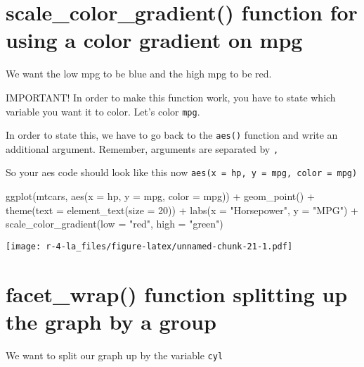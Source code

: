 \documentclass[
]{book}
\newenvironment{Shaded}{\begin{snugshade}}{\end{snugshade}}
\newcommand{\AttributeTok}[1]{\textcolor[rgb]{0.77,0.63,0.00}{#1}}
\newcommand{\DecValTok}[1]{\textcolor[rgb]{0.00,0.00,0.81}{#1}}
\newcommand{\FunctionTok}[1]{\textcolor[rgb]{0.00,0.00,0.00}{#1}}
\newcommand{\NormalTok}[1]{#1}
\newcommand{\SpecialCharTok}[1]{\textcolor[rgb]{0.00,0.00,0.00}{#1}}
\newcommand{\StringTok}[1]{\textcolor[rgb]{0.31,0.60,0.02}{#1}}
\begin{document}
\hypertarget{scale_color_gradient-function-for-using-a-color-gradient-on-mpg}{%
\section{scale\_color\_gradient() function for using a color gradient on mpg}\label{scale_color_gradient-function-for-using-a-color-gradient-on-mpg}}

We want the low mpg to be blue and the high mpg to be red.

IMPORTANT! In order to make this function work, you have to state which variable you want it to color. Let's color \texttt{mpg}.

In order to state this, we have to go back to the \texttt{aes()} function and write an additional argument. Remember, arguments are separated by \texttt{,}

So your aes code should look like this now \texttt{aes(x\ =\ hp,\ y\ =\ mpg,\ color\ =\ mpg)}

\begin{Shaded}
\begin{Highlighting}[]
\FunctionTok{ggplot}\NormalTok{(mtcars, }\FunctionTok{aes}\NormalTok{(}\AttributeTok{x =}\NormalTok{ hp, }\AttributeTok{y =}\NormalTok{ mpg, }\AttributeTok{color =}\NormalTok{ mpg)) }\SpecialCharTok{+}
  \FunctionTok{geom\_point}\NormalTok{() }\SpecialCharTok{+}
  \FunctionTok{theme}\NormalTok{(}\AttributeTok{text =} \FunctionTok{element\_text}\NormalTok{(}\AttributeTok{size =} \DecValTok{20}\NormalTok{)) }\SpecialCharTok{+}
  \FunctionTok{labs}\NormalTok{(}\AttributeTok{x =} \StringTok{"Horsepower"}\NormalTok{, }\AttributeTok{y =} \StringTok{"MPG"}\NormalTok{) }\SpecialCharTok{+}
  \FunctionTok{scale\_color\_gradient}\NormalTok{(}\AttributeTok{low =} \StringTok{"red"}\NormalTok{, }\AttributeTok{high =} \StringTok{"green"}\NormalTok{)}
\end{Highlighting}
\end{Shaded}

\texttt{[image: r-4-la\_files/figure-latex/unnamed-chunk-21-1.pdf]}

\hypertarget{facet_wrap-function-splitting-up-the-graph-by-a-group}{%
\section{facet\_wrap() function splitting up the graph by a group}\label{facet_wrap-function-splitting-up-the-graph-by-a-group}}

We want to split our graph up by the variable \texttt{cyl}
\end{document}
